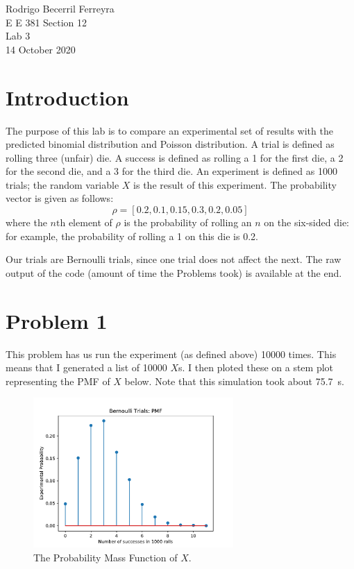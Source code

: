 \documentclass{article}
\begin{document}
    \noindent
    Rodrigo Becerril Ferreyra\\
    E E 381 Section 12\\
    Lab 3\\
    14 October 2020

\section*{Introduction} The purpose of this lab is to compare
an experimental set of results with the predicted binomial
distribution and Poisson distribution. A trial
is defined as
rolling three (unfair) die. A success is defined as
rolling a 1 for the first die, a 2 for the second die, and a
3 for the third die. An experiment is defined as \num{1000}
trials; the random variable \(X\) is the result of this experiment.
The probability vector is given as follows:
\begin{equation*}
    \rho = [0.2, 0.1, 0.15, 0.3, 0.2, 0.05]
\end{equation*} where the \(n\text{th}\) element of \(\rho\)
is the probability of rolling an \(n\) on the six-sided die:
for example, the probability of rolling a \num{1} on this die
is \num{0.2}.

Our trials are Bernoulli trials, since one trial does not
affect the next.
The raw output of the code
(amount of time the Problems took)
is available at the end.

\section{Problem 1} This problem has us run the experiment
(as defined above) \num{10000} times. This means that I
generated a list of \num{10000} \(X\)s. I then ploted these
on a stem plot representing the PMF of \(X\) below.
Note that this simulation took about \SI{75.7}{s}.

\begin{figure}[H]
    \centering
    \includegraphics[height=162pt]{Images/Figure_1}
    \caption{The Probability Mass Function of \(X\).}
    \label{prob1}
\end{figure}
\end{document}
